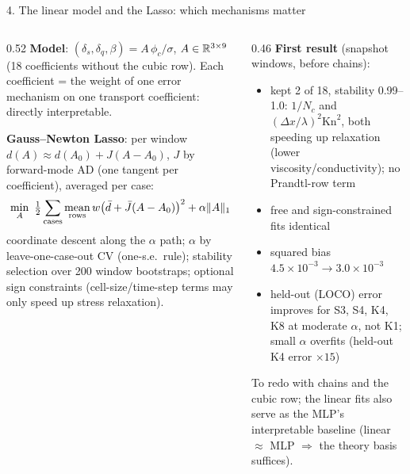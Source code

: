 \documentclass[10pt,aspectratio=169]{beamer}
\begin{document}
\begin{frame}{4. The linear model and the Lasso: which mechanisms matter}
\begin{columns}[T]
\begin{column}{0.52\textwidth}
\small
\textbf{Model}: $(\delta_s,\delta_q,\beta)=A\,\phi_c/\sigma$, \; $A\in\mathbb{R}^{3\times9}$
(18 coefficients without the cubic row). Each coefficient = the weight of one error mechanism
on one transport coefficient: directly interpretable.

\medskip
\textbf{Gauss--Newton Lasso}: per window $d(A)\approx d(A_0)+J(A-A_0)$, $J$ by forward-mode AD
(one tangent per coefficient), averaged per case:
\[
\min_A\ \tfrac12\sum_{\rm cases}\operatorname*{mean}_{\rm rows}
w\big(\bar d+\bar J(A-A_0)\big)^2+\alpha\|A\|_1
\]
coordinate descent along the $\alpha$ path; $\alpha$ by leave-one-case-out CV (one-s.e.\ rule);
stability selection over 200 window bootstraps; optional sign constraints
(cell-size/time-step terms may only speed up stress relaxation).
\end{column}
\begin{column}{0.46\textwidth}
\small
\textbf{First result} (snapshot windows, before chains):
\begin{itemize}\setlength{\itemsep}{2pt}
\item kept 2 of 18, stability 0.99--1.0: $1/N_c$ and $(\Delta x/\lambda)^2\mathrm{Kn}^2$, both
  speeding up relaxation (lower viscosity/conductivity); no Prandtl-row term
\item free and sign-constrained fits identical
\item squared bias $4.5\!\times\!10^{-3}\to3.0\!\times\!10^{-3}$
\item held-out (LOCO) error improves for S3, S4, K4, K8 at moderate $\alpha$, not K1;
  small $\alpha$ overfits (held-out K4 error $\times15$)
\end{itemize}
\footnotesize
To redo with chains and the cubic row; the linear fits also serve as the MLP's interpretable
baseline (linear $\approx$ MLP $\Rightarrow$ the theory basis suffices).
\end{column}
\end{columns}
\end{frame}
\end{document}
